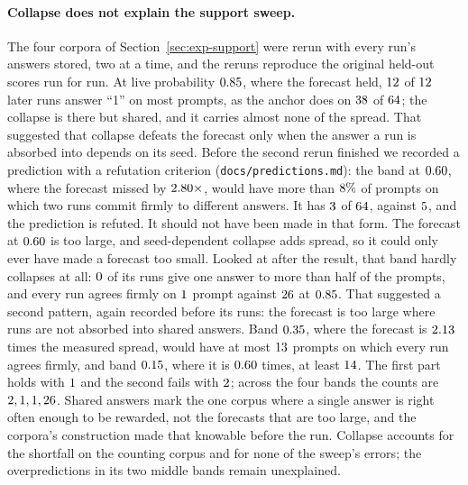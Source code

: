 \paragraph{Collapse does not explain the support sweep.} The four corpora of
Section~\ref{sec:exp-support} were rerun with every run's answers stored, two at a time, and the
reruns reproduce the original held-out scores run for run. At live probability $0.85$,
where the forecast held, $12$ of $12$ later runs answer ``1'' on most prompts, as the
anchor does on $38$ of $64$; the collapse is there but
shared, and it carries almost none of the spread. That suggested that collapse defeats the forecast
only when the answer a run is absorbed into depends on its seed. Before the second rerun finished
we recorded a prediction with a refutation criterion (\texttt{docs/predictions.md}): the band at
$0.60$, where the forecast missed by $2.80\times$, would have
more than $8\%$ of prompts on which two runs commit firmly to different
answers. It has $3$ of $64$, against
$5$, and the prediction is refuted. It should not have been made in that form.
The forecast at $0.60$ is too large, and seed-dependent collapse adds spread, so
it could only ever have made a forecast too small. Looked at after the result, that band hardly
collapses at all: $0$ of its runs give one answer to more than half of the
prompts, and every run agrees firmly on $1$ prompt against
$26$ at $0.85$. That suggested a second pattern, again
recorded before its runs: the forecast is too large where runs are not absorbed into shared
answers. Band $0.35$, where the forecast is $2.13$ times the measured
spread, would have at most $13$ prompts on which every run agrees firmly, and band
$0.15$, where it is $0.60$ times, at least $14$.
The first part holds with $1$ and the second fails with $2$;
across the four bands the counts are $2, 1, 1, 26$. Shared answers mark the one corpus where a
single answer is right often enough to be rewarded, not the forecasts that are too large, and the
corpora's construction made that knowable before the run. Collapse accounts for the shortfall on
the counting corpus and for none of the sweep's errors; the overpredictions in its two middle bands
remain unexplained.

